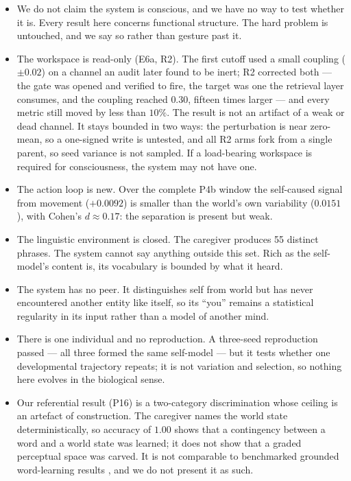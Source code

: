 \documentclass[11pt]{article}
\begin{document}
\begin{itemize}
  \item We do not claim the system is conscious, and we have no way to test whether it is. Every result here concerns functional structure. The hard problem is untouched, and we say so rather than gesture past it.
  \item The workspace is read-only (E6a, R2). The first cutoff used a small coupling ($\pm0.02$) on a channel an audit later found to be inert; R2 corrected both --- the gate was opened and verified to fire, the target was one the retrieval layer consumes, and the coupling reached $0.30$, fifteen times larger --- and every metric still moved by less than $10\%$. The result is not an artifact of a weak or dead channel. It stays bounded in two ways: the perturbation is near zero-mean, so a one-signed write is untested, and all R2 arms fork from a single parent, so seed variance is not sampled. If a load-bearing workspace is required for consciousness, the system may not have one.
  \item The action loop is new. Over the complete P4b window the self-caused signal from movement ($+0.0092$) is smaller than the world's own variability ($0.0151$), with Cohen's $d\approx0.17$: the separation is present but weak.
  \item The linguistic environment is closed. The caregiver produces 55 distinct phrases. The system cannot say anything outside this set. Rich as the self-model's content is, its vocabulary is bounded by what it heard.
  \item The system has no peer. It distinguishes self from world but has never encountered another entity like itself, so its ``you'' remains a statistical regularity in its input rather than a model of another mind.
  \item There is one individual and no reproduction. A three-seed reproduction passed --- all three formed the same self-model --- but it tests whether one developmental trajectory repeats; it is not variation and selection, so nothing here evolves in the biological sense.
  \item Our referential result (P16) is a two-category discrimination whose ceiling is an artefact of construction. The caregiver names the world state deterministically, so accuracy of $1.00$ shows that a contingency between a word and a world state was learned; it does not show that a graded perceptual space was carved. It is not comparable to benchmarked grounded word-learning results \cite{vera2026}, and we do not present it as such.

\end{itemize}
\end{document}
